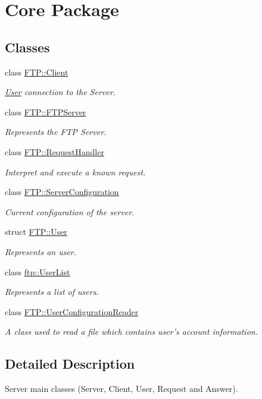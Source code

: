 \hypertarget{group__core}{\section{Core Package}
\label{group__core}
}
\subsection*{Classes}
\begin{DoxyCompactItemize}
\item 
class \hyperlink{classFTP_1_1Client}{F\-T\-P\-::\-Client}
\begin{DoxyCompactList}\small\item\em \hyperlink{structFTP_1_1User}{User} connection to the Server. \end{DoxyCompactList}\item 
class \hyperlink{classFTP_1_1FTPServer}{F\-T\-P\-::\-F\-T\-P\-Server}
\begin{DoxyCompactList}\small\item\em Represents the F\-T\-P Server. \end{DoxyCompactList}\item 
class \hyperlink{classFTP_1_1RequestHandler}{F\-T\-P\-::\-Request\-Handler}
\begin{DoxyCompactList}\small\item\em Interpret and execute a known request. \end{DoxyCompactList}\item 
class \hyperlink{classFTP_1_1ServerConfiguration}{F\-T\-P\-::\-Server\-Configuration}
\begin{DoxyCompactList}\small\item\em Current configuration of the server. \end{DoxyCompactList}\item 
struct \hyperlink{structFTP_1_1User}{F\-T\-P\-::\-User}
\begin{DoxyCompactList}\small\item\em Represents an user. \end{DoxyCompactList}\item 
class \hyperlink{classftp_1_1UserList}{ftp\-::\-User\-List}
\begin{DoxyCompactList}\small\item\em Represents a list of users. \end{DoxyCompactList}\item 
class \hyperlink{classFTP_1_1UserConfigurationReader}{F\-T\-P\-::\-User\-Configuration\-Reader}
\begin{DoxyCompactList}\small\item\em A class used to read a file which contains user's account information. \end{DoxyCompactList}\end{DoxyCompactItemize}


\subsection{Detailed Description}
Server main classes (Server, Client, User, Request and Answer). 